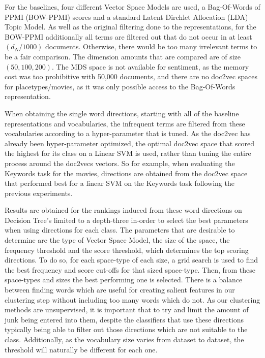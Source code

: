 For the baselines, four different Vector Space Models are used, a Bag-Of-Words of PPMI (BOW-PPMI) scores and a standard Latent Dirchlet Allocation (LDA) Topic Model. As well as the original filtering done to the representations, for the BOW-PPMI additionally all terms are filtered out that do not occur in at least $(d_N / 1000)$ documents. Otherwise, there would be too many irrelevant terms to be a fair comparison. The dimension amounts that are compared are of size $(50, 100, 200)$.
The MDS space is not available for sentiment, as the memory cost was too prohibitive with 50,000 documents, and there are no doc2vec spaces for placetypes/movies, as it was only possible access to the Bag-Of-Words representation.

When obtaining the single word directions, starting with all of the baseline representations and vocabularies, the infrequent terms are filtered from these vocabularies according to a hyper-parameter that is tuned. As the doc2vec has already been hyper-parameter optimized, the optimal doc2vec space that scored the highest for its class on a Linear SVM is used, rather than tuning the entire process around the doc2vecs vectors. So for example, when evaluating the Keywords task for the movies, directions are obtained from the doc2vec space that performed best for a linear SVM on the Keywords task following the previous experiments. 


Results are obtained for the rankings induced from these word directions on Decision Tree's limited to a depth-three in-order to select the best parameters when using directions for each class. The parameters that are desirable to determine are the type of Vector Space Model, the size of the space, the frequency threshold and the score threshold, which determines the top scoring directions. To do so, for each space-type of each size, a grid search is used to find the best frequency and score cut-offs for that sized space-type. Then, from these space-types and sizes the best performing one is selected. There is a balance between finding words which are useful for creating salient features in our clustering step without including too many words which do not. As our clustering methods are unsupervised, it is important that to try and limit the amount of junk being entered into them, despite the classifiers that use these directions typically being able to filter out those directions which are not suitable to the class. Additionally, as the vocabulary size varies from dataset to dataset, the threshold will naturally be different for each one. 


